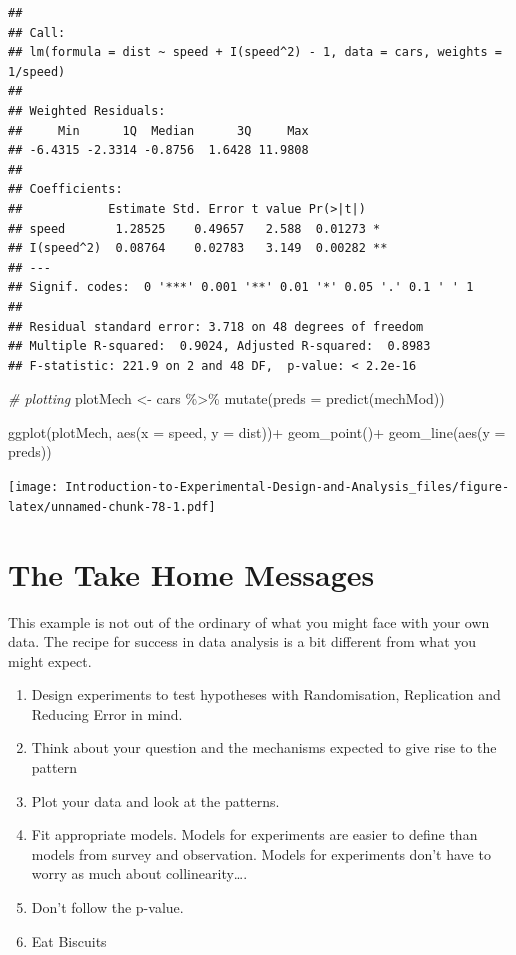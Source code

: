 \documentclass[
]{book}
\newenvironment{Shaded}{\begin{snugshade}}{\end{snugshade}}
\newcommand{\AttributeTok}[1]{\textcolor[rgb]{0.77,0.63,0.00}{#1}}
\newcommand{\CommentTok}[1]{\textcolor[rgb]{0.56,0.35,0.01}{\textit{#1}}}
\newcommand{\FunctionTok}[1]{\textcolor[rgb]{0.00,0.00,0.00}{#1}}
\newcommand{\NormalTok}[1]{#1}
\newcommand{\OtherTok}[1]{\textcolor[rgb]{0.56,0.35,0.01}{#1}}
\newcommand{\SpecialCharTok}[1]{\textcolor[rgb]{0.00,0.00,0.00}{#1}}
\providecommand{\tightlist}{%
  \setlength{\itemsep}{0pt}\setlength{\parskip}{0pt}}
\begin{document}
\begin{verbatim}
## 
## Call:
## lm(formula = dist ~ speed + I(speed^2) - 1, data = cars, weights = 1/speed)
## 
## Weighted Residuals:
##     Min      1Q  Median      3Q     Max 
## -6.4315 -2.3314 -0.8756  1.6428 11.9808 
## 
## Coefficients:
##            Estimate Std. Error t value Pr(>|t|)   
## speed       1.28525    0.49657   2.588  0.01273 * 
## I(speed^2)  0.08764    0.02783   3.149  0.00282 **
## ---
## Signif. codes:  0 '***' 0.001 '**' 0.01 '*' 0.05 '.' 0.1 ' ' 1
## 
## Residual standard error: 3.718 on 48 degrees of freedom
## Multiple R-squared:  0.9024, Adjusted R-squared:  0.8983 
## F-statistic: 221.9 on 2 and 48 DF,  p-value: < 2.2e-16
\end{verbatim}

\begin{Shaded}
\begin{Highlighting}[]
\CommentTok{\# plotting}
\NormalTok{plotMech }\OtherTok{\textless{}{-}}\NormalTok{ cars }\SpecialCharTok{\%\textgreater{}\%} 
  \FunctionTok{mutate}\NormalTok{(}\AttributeTok{preds =} \FunctionTok{predict}\NormalTok{(mechMod))}

\FunctionTok{ggplot}\NormalTok{(plotMech, }\FunctionTok{aes}\NormalTok{(}\AttributeTok{x =}\NormalTok{ speed, }\AttributeTok{y =}\NormalTok{ dist))}\SpecialCharTok{+}
  \FunctionTok{geom\_point}\NormalTok{()}\SpecialCharTok{+}
  \FunctionTok{geom\_line}\NormalTok{(}\FunctionTok{aes}\NormalTok{(}\AttributeTok{y =}\NormalTok{ preds))}
\end{Highlighting}
\end{Shaded}

\texttt{[image: Introduction-to-Experimental-Design-and-Analysis\_files/figure-latex/unnamed-chunk-78-1.pdf]}

\hypertarget{the-take-home-messages}{%
\section{The Take Home Messages}\label{the-take-home-messages}}

This example is not out of the ordinary of what you might face with your own data. The recipe for success in data analysis is a bit different from what you might expect.

\begin{enumerate}
\def\labelenumi{\arabic{enumi}.}
\tightlist
\item
  Design experiments to test hypotheses with Randomisation, Replication and Reducing Error in mind.
\item
  Think about your question and the mechanisms expected to give rise to the pattern
\item
  Plot your data and look at the patterns.
\item
  Fit appropriate models. Models for experiments are easier to define than models from survey and observation. Models for experiments don't have to worry as much about collinearity\ldots.
\item
  Don't follow the p-value.
\item
  Eat Biscuits
\end{enumerate}
\end{document}
